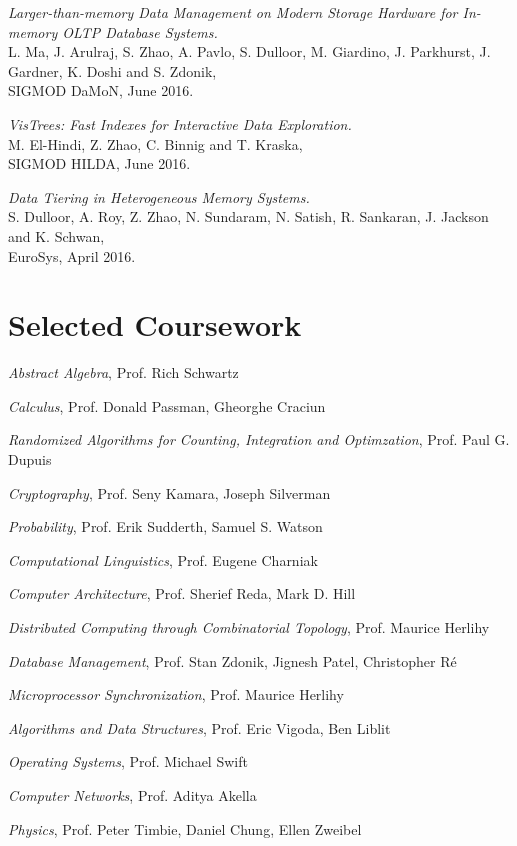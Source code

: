\documentclass[letterpaper]{article}
\renewenvironment{itemize}{
  \begin{list}{}{
    \setlength{\leftmargin}{1.5em}
  }
}{
  \end{list}
}
\begin{document}
\begin{itemize}
\item \textit{Larger-than-memory Data Management on Modern Storage Hardware for In-memory OLTP Database Systems.} \\
  L. Ma, J. Arulraj, S. Zhao, A. Pavlo, S. Dulloor, M. Giardino, J. Parkhurst, J. Gardner, K. Doshi and S. Zdonik, \\
  SIGMOD DaMoN, June 2016.

\item \textit{VisTrees: Fast Indexes for Interactive Data Exploration.} \\
  M. El-Hindi, Z. Zhao, C. Binnig and T. Kraska, \\
  SIGMOD HILDA, June 2016.

\item \textit{Data Tiering in Heterogeneous Memory Systems.} \\
  S. Dulloor, A. Roy, Z. Zhao, N. Sundaram, N. Satish, R. Sankaran, J. Jackson and K. Schwan, \\
  EuroSys, April 2016.

\end{itemize}

\section*{Selected Coursework}
\begin{itemize}
\item \textit{Abstract Algebra}, Prof. Rich Schwartz
\item \textit{Calculus}, Prof. Donald Passman, Gheorghe Craciun
\item \textit{Randomized Algorithms for Counting, Integration and Optimzation}, Prof. Paul G. Dupuis
\item \textit{Cryptography}, Prof. Seny Kamara, Joseph Silverman
\item \textit{Probability}, Prof. Erik Sudderth, Samuel S. Watson 
\item \textit{Computational Linguistics}, Prof. Eugene Charniak
\item \textit{Computer Architecture}, Prof. Sherief Reda, Mark D. Hill
\item \textit{Distributed Computing through Combinatorial Topology}, Prof. Maurice Herlihy
\item \textit{Database Management}, Prof. Stan Zdonik, Jignesh Patel, Christopher R\'e
\item \textit{Microprocessor Synchronization}, Prof. Maurice Herlihy
\item \textit{Algorithms and Data Structures}, Prof. Eric Vigoda, Ben Liblit
\item \textit{Operating Systems}, Prof. Michael Swift
\item \textit{Computer Networks}, Prof. Aditya Akella
\item \textit{Physics}, Prof. Peter Timbie, Daniel Chung, Ellen Zweibel
\end{itemize}

\bigskip
\end{document}
